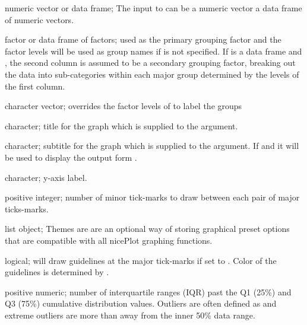 \documentclass[a4paper]{book}
\begin{document}
\begin{Arguments}
\begin{ldescription}
\item[\code{x}] numeric vector or data frame; The input to  can be a numeric vector a  data frame of numeric vectors.

\item[\code{by}] factor or data frame of factors; used as the primary grouping factor and the factor levels will be used as group names if  is not specified. If  is a data frame and , the second column is assumed to be a secondary grouping factor, breaking out the data into sub-categories within each major group determined by the levels of the first column.

\item[\code{groupNames}] character vector; overrides the factor levels of  to label the groups

\item[\code{main}] character; title for the graph which is supplied to the  argument.

\item[\code{sub}] character; subtitle for the graph which is supplied to the  argument. If  and  it will be used to display the output form .

\item[\code{ylab}] character; y-axis label.

\item[\code{minorTick}] positive integer; number of minor tick-marks to draw between each pair of major ticks-marks.

\item[\code{theme}] list object; Themes are are an optional way of storing graphical preset options that are compatible with all nicePlot graphing functions.

\item[\code{guides}] logical; will draw guidelines at the major tick-marks if set to . Color of the guidelines is determined by .

\item[\code{outliers}] positive numeric; number of interquartile ranges (IQR) past the Q1 (25\%) and Q3 (75\%) cumulative distribution values. Outliers are often defined as  and extreme outliers are more than  away from the inner 50\% data range.


\end{ldescription}
\end{Arguments}
\end{document}
